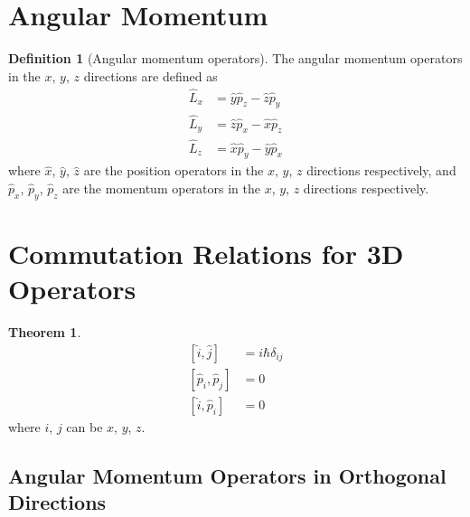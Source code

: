 \documentclass[titlepage, fleqn, a4paper, 12pt, twoside]{article}
\theoremstyle{definition}
\newtheorem{definition}{Definition}
\theoremstyle{theorem}
\newtheorem{theorem}{Theorem}
\begin{document}
\section{Angular Momentum}

\begin{definition}[Angular momentum operators]
	The angular momentum operators in the $x$, $y$, $z$ directions are defined as
	\begin{align*}
		\hat{L}_x &= \hat{y} \hat{p}_z - \hat{z} \hat{p}_y\\
		\hat{L}_y &= \hat{z} \hat{p}_x - \hat{x} \hat{p}_z\\
		\hat{L}_z &= \hat{x} \hat{p}_y - \hat{y} \hat{p}_x
	\end{align*}
	where $\hat{x}$, $\hat{y}$, $\hat{z}$ are the position operators in the $x$, $y$, $z$ directions respectively, and $\hat{p}_x$, $\hat{p}_y$, $\hat{p}_z$ are the momentum operators in the $x$, $y$, $z$ directions respectively.
\end{definition}

\section{Commutation Relations for 3D Operators}

\begin{theorem}
	\begin{align*}
		\left[ \hat{i},\hat{j} \right] &= i \hbar \delta_{i j}\\
		\left[ \hat{p}_i,\hat{p}_j \right] &= 0\\
		\left[ \hat{i},\hat{p}_i \right] &= 0
	\end{align*}
	where $i$, $j$ can be $x$, $y$, $z$.
\end{theorem}

\subsection{Angular Momentum Operators in Orthogonal Directions}
\end{document}
